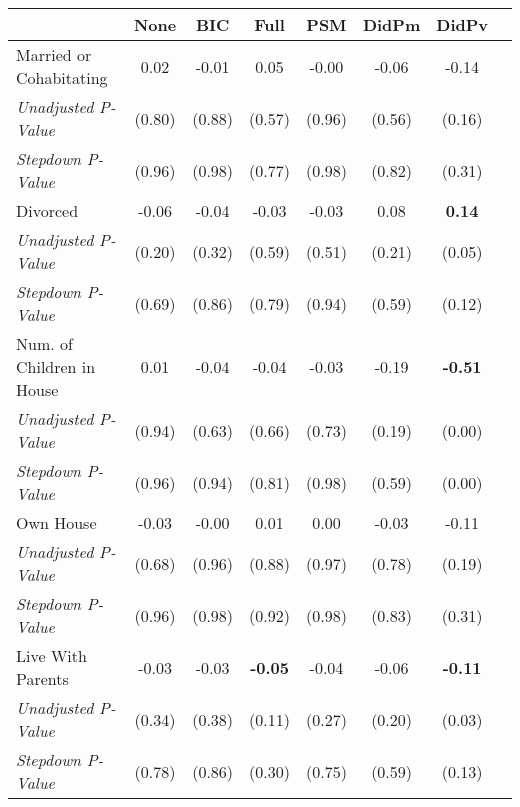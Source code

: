 \begin{tabular}{l c c c c c c c}
\toprule
 & None & BIC & Full & PSM & DidPm & DidPv \\
\midrule
Married or Cohabitating & 0.02 & -0.01 & 0.05 & -0.00 & -0.06 & -0.14 \\
\quad \textit{Unadjusted P-Value} & (0.80) & (0.88) & (0.57) & (0.96) & (0.56) & (0.16) \\
\quad \textit{Stepdown P-Value} & (0.96) & (0.98) & (0.77) & (0.98) & (0.82) & (0.31) \\
Divorced & -0.06 & -0.04 & -0.03 & -0.03 & 0.08 & \textbf{ 0.14 } \\
\quad \textit{Unadjusted P-Value} & (0.20) & (0.32) & (0.59) & (0.51) & (0.21) & (0.05) \\
\quad \textit{Stepdown P-Value} & (0.69) & (0.86) & (0.79) & (0.94) & (0.59) & (0.12) \\
Num. of Children in House & 0.01 & -0.04 & -0.04 & -0.03 & -0.19 & \textbf{ -0.51 } \\
\quad \textit{Unadjusted P-Value} & (0.94) & (0.63) & (0.66) & (0.73) & (0.19) & (0.00) \\
\quad \textit{Stepdown P-Value} & (0.96) & (0.94) & (0.81) & (0.98) & (0.59) & (0.00) \\
Own House & -0.03 & -0.00 & 0.01 & 0.00 & -0.03 & -0.11 \\
\quad \textit{Unadjusted P-Value} & (0.68) & (0.96) & (0.88) & (0.97) & (0.78) & (0.19) \\
\quad \textit{Stepdown P-Value} & (0.96) & (0.98) & (0.92) & (0.98) & (0.83) & (0.31) \\
Live With Parents & -0.03 & -0.03 & \textbf{ -0.05 } & -0.04 & -0.06 & \textbf{ -0.11 } \\
\quad \textit{Unadjusted P-Value} & (0.34) & (0.38) & (0.11) & (0.27) & (0.20) & (0.03) \\
\quad \textit{Stepdown P-Value} & (0.78) & (0.86) & (0.30) & (0.75) & (0.59) & (0.13) \\
\bottomrule
\end{tabular}

